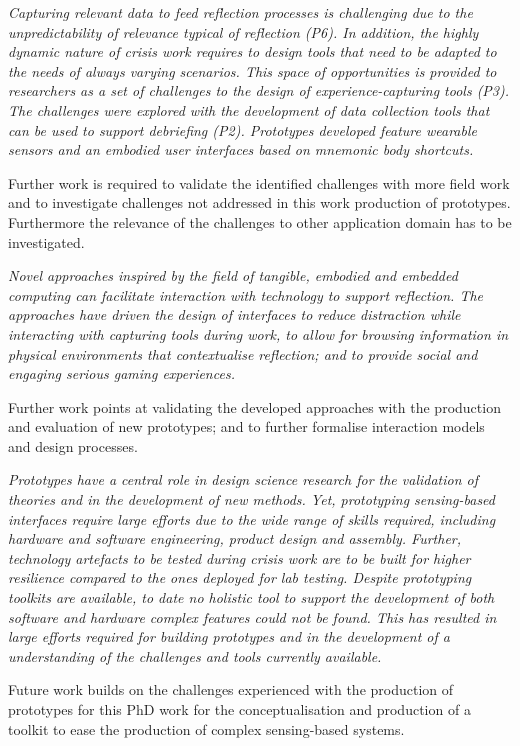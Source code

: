 \begin{framed}
\emph{Capturing relevant data to feed reflection processes is challenging due to the unpredictability of relevance typical of reflection (P6). In addition, the highly dynamic nature of crisis work requires to design tools that need to be adapted to the  needs of always varying scenarios. This space of opportunities is provided to researchers as a set of challenges to the design of experience-capturing tools (P3). The challenges were explored with the development of data collection tools that can be used to support debriefing (P2). Prototypes developed feature wearable sensors and an embodied user interfaces based on mnemonic body shortcuts.}
\par
Further work is required to validate the identified challenges with more field work and to investigate challenges not addressed in this work production of prototypes. Furthermore the relevance of the challenges to other application domain has to be investigated. 
\end{framed}

\begin{framed}
\emph{Novel approaches inspired by the field of tangible, embodied and embedded computing can facilitate interaction with technology to support reflection. The approaches have driven the design of interfaces to reduce distraction while interacting with capturing tools during work, to allow for browsing information in physical environments that contextualise reflection; and to provide social and engaging serious gaming experiences.}
\par
Further work points at validating the developed approaches with the production and evaluation of new prototypes; and to further formalise interaction models and design processes.
\end{framed}

\begin{framed}
\emph{Prototypes have a central role in design science research for the validation of theories and in the development of new methods. Yet, prototyping sensing-based interfaces require large efforts due to the wide range of skills required, including hardware and software engineering, product design and assembly. Further, technology artefacts to be tested during crisis work are to be built for higher resilience compared to the ones deployed for lab testing. Despite prototyping toolkits are available, to date no holistic tool to support the development of both software and hardware complex features could not be found. This has resulted in large efforts required for building prototypes and in the development of a understanding of the challenges and tools currently available.}
\par
Future work builds on the challenges experienced with the production of prototypes for this PhD work for the conceptualisation and production of a toolkit to ease the production of complex sensing-based systems. 
\end{framed}

